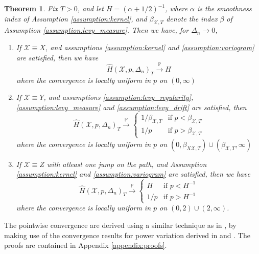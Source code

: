 \documentclass[fleqn,11pt,letterpaper]{article}
\theoremstyle{plain}
\newtheorem{theorem}{Theorem}[section]
\theoremstyle{definition}
\theoremstyle{remark}
\numberwithin{equation}{section}
\begin{document}
\begin{theorem}\label{thm:consistency}
 Fix $T>0$, and let $H=(\alpha+1/2)^{-1}$, where $\alpha$ is the smoothness index of Assumption \ref{assumption:kernel}, and $\beta_{\mathcal{X},T}$ denote the index $\beta$ of Assumption \ref{assumption:levy_measure}. Then we have, for $\Delta_n\to0$, 
\begin{enumerate}
    \item If $\mathcal{X}\equiv X$, and assumptions \ref{assumption:kernel} and \ref{assumption:variogram} are satisfied, then we have 
    \begin{equation}
        \hat{H}(\mathcal{X},p,\Delta_n)_T\overset{\mathbb{P}}{\longrightarrow}H
    \end{equation}
    where the convergence is locally uniform in $p$ on $(0,\infty)$
    \item If $\mathcal{X}\equiv Y$, and assumptions \ref{assumption:levy_regularity}, \ref{assumption:levy_measure} and \ref{assumption:levy_drift} are satisfied, then
    \begin{equation}
        \hat{H}(\mathcal{X},p,\Delta_n)_T\overset{\mathbb{P}}{\longrightarrow}
        \begin{cases}
            1/\beta_{\mathcal{X},T} & \text{if }p<\beta_{\mathcal{X},T}\\
            1/p & \text{if }p>\beta_{\mathcal{X},T}
        \end{cases}
    \end{equation}
    where the convergence is locally uniform in $p$ on $(0,\beta_{X\mathcal{X},T})\cup(\beta_{\mathcal{X},T},\infty)$
    \item If $\mathcal{X}\equiv Z$ with atleast one jump on the path, and Assumption \ref{assumption:kernel} and \ref{assumption:variogram} are satisfied, then we have 
    \begin{equation}
        \hat{H}(\mathcal{X},p,\Delta_n)_T\overset{\mathbb{P}}{\longrightarrow}
        \begin{cases}
            H & \text{if }p<H^{-1}\\
            1/p & \text{if }p>H^{-1}
        \end{cases}
    \end{equation}  
    where the convergence is locally uniform in $p$ on $(0,2)\cup(2,\infty)$.
\end{enumerate}
\end{theorem}
The pointwise convergence are derived using a similar technique as in \cite{Woener2011}, by making use of the convergence results for power variation derived in \cite{Todorov2010} and \cite{Corcuera2013}. The proofs are contained in Appendix \ref{appendix:proofs}.
\end{document}
